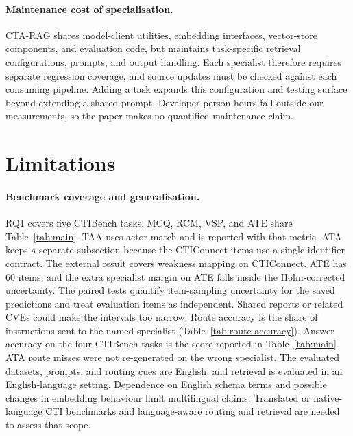 \documentclass[5p,times,authoryear]{elsarticle}
\begin{document}
\paragraph{Maintenance cost of specialisation.}
CTA-RAG shares model-client utilities, embedding interfaces, vector-store
components, and evaluation code, but maintains task-specific retrieval
configurations, prompts, and output handling. Each specialist therefore
requires separate regression coverage, and source updates must be checked
against each consuming pipeline. Adding a task expands this
configuration and testing surface beyond extending a shared prompt. Developer
person-hours fall outside our measurements, so the paper makes no quantified
maintenance claim.

\section{Limitations}\label{sec:limitations}

\paragraph{Benchmark coverage and generalisation.}
RQ1 covers five CTIBench tasks. MCQ, RCM, VSP, and ATE share Table~\ref{tab:main}. TAA uses actor match and is reported with that metric. ATA keeps a separate subsection because the CTIConnect items use a single-identifier contract. The external result covers weakness mapping on CTIConnect. ATE has 60 items, and the extra specialist margin on ATE falls inside the Holm-corrected uncertainty. The paired tests quantify item-sampling uncertainty for the saved predictions and treat evaluation items as independent. Shared reports or related CVEs could make the intervals too narrow. Route accuracy is the share of instructions sent to the named specialist (Table~\ref{tab:route-accuracy}). Answer accuracy on the four CTIBench tasks is the score reported in Table~\ref{tab:main}. ATA route misses were not re-generated on the wrong specialist.
The evaluated datasets, prompts, and routing cues are English, and retrieval
is evaluated in an English-language setting. Dependence on English schema
terms and possible changes in embedding behaviour limit multilingual claims.
Translated or native-language CTI benchmarks and language-aware routing and
retrieval are needed to assess that scope.
\end{document}
